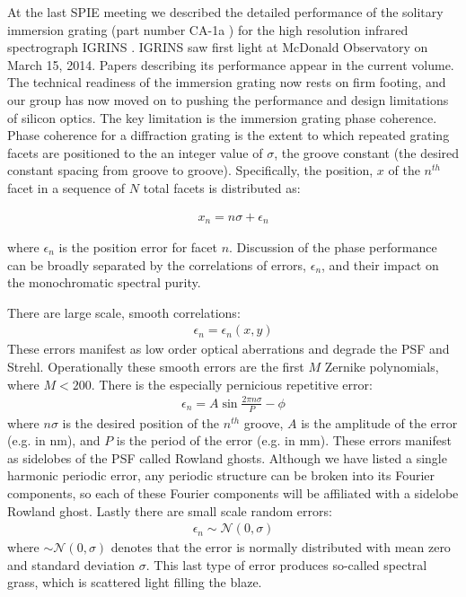 \documentclass[]{spie}  %
\begin{document}
At the last SPIE meeting we described the detailed performance of the solitary immersion grating (part number CA-1a \cite{2012SPIE.8450E..2SG}) for the high resolution infrared spectrograph IGRINS \cite{2010SPIE.7735E..54Y}.  IGRINS saw first light at McDonald Observatory on March 15, 2014.  Papers describing its performance appear in the current volume.  The technical readiness of the immersion grating now rests on firm footing, and our group has now moved on to pushing the performance and design limitations of silicon optics.  The key limitation is the immersion grating phase coherence.  Phase coherence for a diffraction grating is the extent to which repeated grating facets are positioned to the an integer value of $\sigma$, the groove constant (the desired constant spacing from groove to groove).  Specifically, the position, $x$ of the $n^{th}$ facet in a sequence of $N$ total facets is distributed as: 

\begin{eqnarray}
x_n = n\sigma + \epsilon_n  \label{eqn:Epsilon}
\end{eqnarray}

where $\epsilon_n$ is the position error for facet $n$.  Discussion of the phase performance can be broadly separated by the correlations  of errors, $\epsilon_n$, and their impact on the monochromatic spectral purity.  


There are large scale, smooth correlations:
\begin{eqnarray}
\epsilon_n = \epsilon_n(x, y) \label{eqn:smooth}
\end{eqnarray}
These errors manifest as low order optical aberrations and degrade the PSF and Strehl.  Operationally these smooth errors are the first $M$ Zernike polynomials, where $M < 200$.  There is the especially pernicious repetitive error:
\begin{eqnarray}
\epsilon_n = A\sin{\frac{2\pi n\sigma}{P} - \phi} \label{eqn:Periodic}
\end{eqnarray}
where $n\sigma$ is the desired position of the $n^{th}$ groove, $A$ is the amplitude of the error (e.g. in nm), and $P$ is the period of the error (e.g. in mm).  These errors manifest as sidelobes of the PSF called Rowland ghosts.  Although we have listed a single harmonic periodic error, any periodic structure can be broken into its Fourier components, so each of these Fourier components will be affiliated with a sidelobe Rowland ghost.  Lastly there are small scale random errors:
\begin{eqnarray}
\epsilon_n \sim \mathcal{N}(0, \sigma)
\end{eqnarray}
where $ \sim \mathcal{N}(0, \sigma)$ denotes that the error is normally distributed with mean zero and standard deviation $\sigma$.  This last type of error produces so-called spectral grass\cite{2007ApOpt..46.3400M}, which is scattered light filling the blaze.
\end{document}
